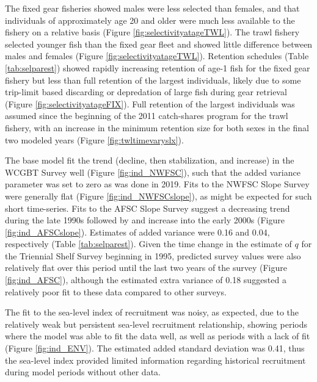 \documentclass[11pt,
  english,
  a4paper,
]{article}
\begin{document}
The fixed gear fisheries showed males were less selected than females, and that individuals of approximately age 20 and older were much less available to the fishery on a relative basis (Figure \ref{fig:selectivityatageTWL}). The trawl fishery selected younger fish than the fixed gear fleet and showed little difference between males and females (Figure \ref{fig:selectivityatageTWL}). Retention schedules (Table \ref{tab:selparest}) showed rapidly increasing retention of age-1 fish for the fixed gear fishery but less than full retention of the largest individuals, likely due to some trip-limit based discarding or depredation of large fish during gear retrieval (Figure \ref{fig:selectivityatageFIX}). Full retention of the largest individuals was assumed since the beginning of the 2011 catch-shares program for the trawl fishery, with an increase in the minimum retention size for both sexes in the final two modeled years (Figure \ref{fig:twltimevaryslx}).

\leavevmode\tagmcend\tagstructend\par


The base model fit the trend (decline, then stabilization, and increase) in the WCGBT Survey well (Figure \ref{fig:ind_NWFSC}), such that the added variance parameter was set to zero as was done in 2019. Fits to the NWFSC Slope Survey were generally flat (Figure \ref{fig:ind_NWFSCslope}), as might be expected for such short time-series. Fits to the AFSC Slope Survey suggest a decreasing trend during the late 1990s followed by and increase into the early 2000s (Figure \ref{fig:ind_AFSCslope}). Estimates of added variance were 0.16 and 0.04, respectively (Table \ref{tab:selparest}). Given the time change in the estimate of {\(q\)\leavevmode\tagmcend\tagstructend} for the Triennial Shelf Survey beginning in 1995, predicted survey values were also relatively flat over this period until the last two years of the survey (Figure \ref{fig:ind_AFSC}), although the estimated extra variance of 0.18 suggested a relatively poor fit to these data compared to other surveys.

\leavevmode\tagmcend\tagstructend\par


The fit to the sea-level index of recruitment was noisy, as expected, due to the relatively weak but persistent sea-level recruitment relationship, showing periods where the model was able to fit the data well, as well as periods with a lack of fit (Figure \ref{fig:ind_ENV}). The estimated added standard deviation was 0.41, thus the sea-level index provided limited information regarding historical recruitment during model periods without other data.
\end{document}
